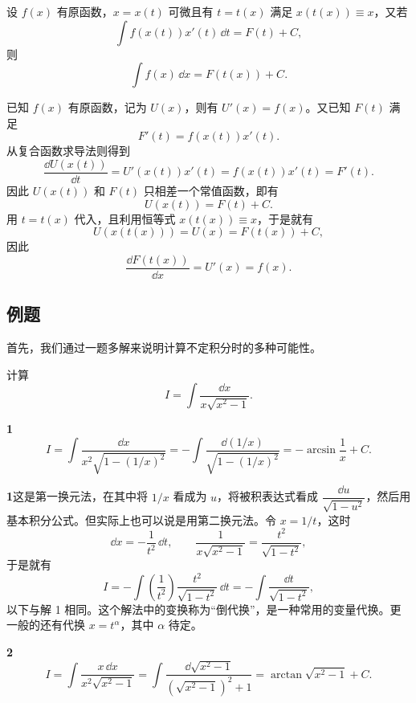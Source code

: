 \begin{xproposition}[9.1.1（第二换元法的证明）]
设 $f(x)$ 有原函数，$x=x(t)$ 可微且有 $t=t(x)$ 满足 $x(t(x))\equiv x$，又若
\[
  \int f(x(t))x'(t)\,\dd t=F(t)+C,
\]
则
\[
  \int f(x)\,\dd x=F(t(x))+C.
\]
\end{xproposition}

\begin{xproof}
已知 $f(x)$ 有原函数，记为 $U(x)$，则有 $U'(x)=f(x)$。又已知 $F(t)$ 满足
\[
  F'(t)=f(x(t))x'(t).
\]
从复合函数求导法则得到
\[
  \frac{\dd U(x(t))}{\dd t}=U'(x(t))x'(t)=f(x(t))x'(t)=F'(t).
\]
因此 $U(x(t))$ 和 $F(t)$ 只相差一个常值函数，即有
\[
  U(x(t))=F(t)+C.
\]
用 $t=t(x)$ 代入，且利用恒等式 $x(t(x))\equiv x$，于是就有
\[
  U(x(t(x)))=U(x)=F(t(x))+C,
\]
因此
\[
  \frac{\dd F(t(x))}{\dd x}=U'(x)=f(x).
\]
\end{xproof}

\subsection{例题}

首先，我们通过一题多解来说明计算不定积分时的多种可能性。

\begin{xexample}[9.1.1]
计算
\[
  I=\int\frac{\dd x}{x\sqrt{x^2-1}}.
\]
\end{xexample}

\begin{xsolution}
\textbf{1}\quad
\[
  I=\int\frac{\dd x}{x^2\sqrt{1-(1/x)^2}}
   =-\int\frac{\dd(1/x)}{\sqrt{1-(1/x)^2}}
   =-\arcsin\frac1x+C.
\]
\end{xsolution}

\begin{xremark}
\textbf{1}\quad 这是第一换元法，在其中将 $1/x$ 看成为 $u$，将被积表达式看成 $\dfrac{\dd u}{\sqrt{1-u^2}}$，然后用基本积分公式。但实际上也可以说是用第二换元法。令 $x=1/t$，这时
\[
  \dd x=-\frac1{t^2}\,\dd t,
  \qquad
  \frac1{x\sqrt{x^2-1}}=\frac{t^2}{\sqrt{1-t^2}},
\]
于是就有
\[
  I=-\int\left(\frac1{t^2}\right)\frac{t^2}{\sqrt{1-t^2}}\,\dd t
   =-\int\frac{\dd t}{\sqrt{1-t^2}},
\]
以下与解 1 相同。这个解法中的变换称为“倒代换”，是一种常用的变量代换。更一般的还有代换 $x=t^\alpha$，其中 $\alpha$ 待定。
\end{xremark}

\begin{xsolution}
\textbf{2}\quad
\[
  I=\int\frac{x\,\dd x}{x^2\sqrt{x^2-1}}
   =\int\frac{\dd\sqrt{x^2-1}}{(\sqrt{x^2-1})^2+1}
   =\arctan\sqrt{x^2-1}+C.
\]
\end{xsolution}

